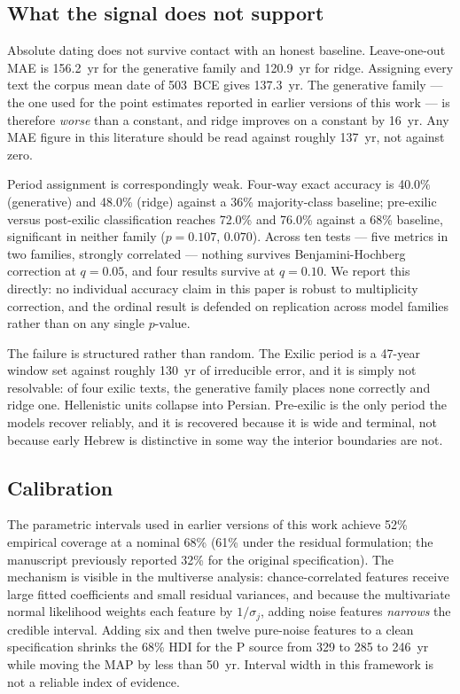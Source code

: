 \subsection*{What the signal does not support}

Absolute dating does not survive contact with an honest baseline.
Leave-one-out MAE is 156.2~yr for the generative family and 120.9~yr for
ridge.  Assigning every text the corpus mean date of 503~BCE gives 137.3~yr.
The generative family --- the one used for the point estimates reported in
earlier versions of this work --- is therefore \emph{worse} than a
constant, and ridge improves on a constant by 16~yr.  Any MAE figure in
this literature should be read against roughly 137~yr, not against zero.

Period assignment is correspondingly weak.  Four-way exact accuracy is
40.0\% (generative) and 48.0\% (ridge) against a 36\% majority-class
baseline; pre-exilic versus post-exilic classification reaches 72.0\% and
76.0\% against a 68\% baseline, significant in neither family
($p = 0.107$, $0.070$).  Across ten tests --- five metrics in two families,
strongly correlated --- nothing survives Benjamini-Hochberg correction at
$q = 0.05$, and four results survive at $q = 0.10$.  We report this
directly: no individual accuracy claim in this paper is robust to
multiplicity correction, and the ordinal result is defended on replication
across model families rather than on any single $p$-value.

The failure is structured rather than random.  The Exilic period is a
47-year window set against roughly 130~yr of irreducible error, and it is
simply not resolvable: of four exilic texts, the generative family places
none correctly and ridge one.  Hellenistic units collapse into Persian.
Pre-exilic is the only period the models recover reliably, and it is
recovered because it is wide and terminal, not because early Hebrew is
distinctive in some way the interior boundaries are not.

\subsection*{Calibration}

The parametric intervals used in earlier versions of this work achieve
52\% empirical coverage at a nominal 68\% (61\% under the residual
formulation; the manuscript previously reported 32\% for the original
specification).  The mechanism is visible in the multiverse analysis:
chance-correlated features receive large fitted coefficients and small
residual variances, and because the multivariate normal likelihood weights
each feature by $1/\sigma_j$, adding noise features \emph{narrows} the
credible interval.  Adding six and then twelve pure-noise features to a
clean specification shrinks the 68\% HDI for the P source from 329 to 285
to 246~yr while moving the MAP by less than 50~yr.  Interval width in this
framework is not a reliable index of evidence.

